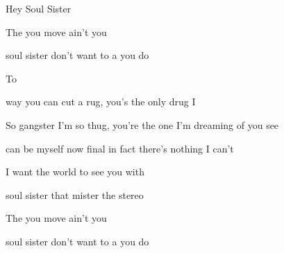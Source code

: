 \begin{SBSong}{Hey Soul Sister}
\begin{SBChorus}
    The  you move ain't  you 

     soul sister  don't want to  a   you do  

    To
  \end{SBChorus}
  \CBPageBrk
  \begin{SBVerse}
     way you can cut a rug,  you's the only drug I 

    So gangster I'm so thug, you're the  one I'm dreaming of you see

     can be myself now final in fact there's nothing I can't 
    
    I want the world to see you  with 
  \end{SBVerse}
  \begin{SBChorus}
     soul sister  that mister   the  stereo

    The  you move ain't  you 

     soul sister  don't want to  a   you do 
  \end{SBChorus}
\end{SBSong}